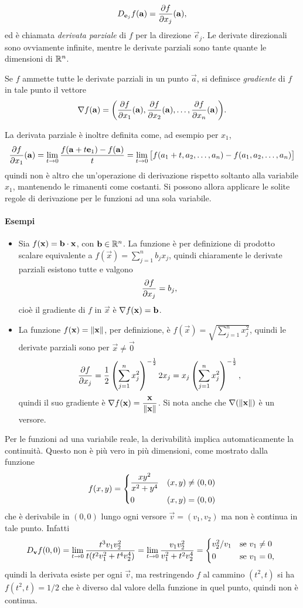 \[
D_{\mathbf{e}_j}f(\mathbf{a})=\frac{\partial {f}}{\partial {x_j}}(\mathbf{a}),
\]
ed è chiamata \emph{derivata parziale} di $f$ per la direzione $\vec e_j$.
Le derivate direzionali sono ovviamente infinite, mentre le derivate parziali sono tante quante le dimensioni di $\mathbb{R}^n$.
\begin{definizione} \label{d:grad}
Se $f$ ammette tutte le derivate parziali in un punto $\vec a$, si definisce \emph{gradiente} di $f$ in tale punto il vettore
\begin{equation} \label{eq:grad}
\nabla f(\mathbf{a})=\bigg(\frac{\partial {f}}{\partial {x_1}}(\mathbf{a}),\frac{\partial {f}}{\partial {x_2}}(\mathbf{a}),\dots,\frac{\partial {f}}{\partial {x_n}}(\mathbf{a})\bigg).
\end{equation}
\end{definizione}
La derivata parziale è inoltre definita come, ad esempio per $x_1$,
\[
\frac{\partial {f}}{\partial {x_1}}(\mathbf{a})=\lim_{t\to 0}\frac{f(\mathbf{a}+t\mathbf{e}_1)-f(\mathbf{a})}{t}=\lim_{t\to 0}\big[f(a_1+t,a_2,\dots,a_n)-f(a_1,a_2,\dots,a_n)\big]
\]
quindi non è altro che un'operazione di derivazione rispetto soltanto alla variabile $x_1$, mantenendo le rimanenti come costanti. Si possono allora applicare le solite regole di derivazione per le funzioni ad una sola variabile.
\paragraph{Esempi}
\begin{itemize}
\item Sia $f(\mathbf{x})={\mathbf{b}}\cdot{\mathbf{x}}$, con $\mathbf{b}\in\mathbb{R}^n$. La funzione è per definizione di prodotto scalare equivalente a $f(\vec x)=\sum_{j=1}^nb_jx_j$, quindi chiaramente le derivate parziali esistono tutte e valgono
\[
\frac{\partial {f}}{\partial {x_j}}=b_j,
\]
cioè il gradiente di $f$ in $\vec x$ è $\nabla f(\mathbf{x})=\mathbf{b}$.
\item La funzione $f(\mathbf{x})=\left\|{\mathbf{x}}\right\|$, per definizione, è $f(\vec x)=\sqrt{\sum_{j=1}^nx_j^2}$, quindi le derivate parziali sono per $\vec x\neq\vec 0$
\[
\frac{\partial {f}}{\partial {x_j}}=\frac12\left(\sum_{j=1}^nx_j^2\right)^{-\frac{1}{2}}2x_j=x_j\left(\sum_{j=1}^nx_j^2\right)^{-\frac{1}{2}},
\]
quindi il suo gradiente è $\nabla f(\mathbf{x})=\dfrac{\mathbf{x}}{\left\|{\mathbf{x}}\right\|}$. Si nota anche che $\nabla(\left\|{\mathbf{x}}\right\|)$ è un versore.
\end{itemize}

Per le funzioni ad una variabile reale, la derivabilità implica automaticamente la continuità. Questo non è più vero in più dimensioni, come mostrato dalla funzione
\[
f(x,y)=\begin{dcases}
\frac{xy^2}{x^2+y^4}	&(x,y)\neq(0,0)\\
0					&(x,y)=(0,0)
\end{dcases}
\]
che è derivabile in $(0,0)$ lungo ogni versore $\vec v=(v_1,v_2)$ ma non è continua in tale punto. Infatti
\[
D_{\vec v}f(0,0)=\lim_{t\to 0}\frac{t^3v_1v_2^2}{t(t^2v_1^2+t^4v_2^4)}=\lim_{t\to 0}\frac{v_1v_2^2}{v_1^2+t^2v_2^4}=
\begin{cases*}
v_2^2/v_1	&se $v_1\neq 0$\\
0			&se $v_1=0$,
\end{cases*}
\]
quindi la derivata esiste per ogni $\vec v$, ma restringendo $f$ al cammino $(t^2,t)$ si ha $f(t^2,t)=1/2$ che è diverso dal valore della funzione in quel punto, quindi non è continua.

